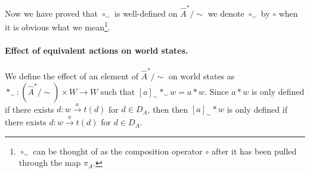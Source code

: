 Now we have proved that $\circ_{\sim}$ is well-defined on $\hat{A}^{\ast}/\sim$ we denote $\circ_{\sim}$ by $\circ$ when it is obvious what we mean\footnote{$\circ_{\sim}$ can be thought of as the composition operator $\circ$ after it has been pulled through the map $\pi_{A}$.}.

\paragraph{Effect of equivalent actions on world states.}
We define the effect of an element of  $\hat{A}^{\ast}/\sim$ on world states as $\ast_{\sim}: (\hat{A}^{\ast}/\sim) \times W \to W$ such that $[a]_{\sim} \ast_{\sim} w = a \ast w$.
Since $a \ast w$ is only defined if there exists $d: w \xrightarrow{a} t(d)$ for $d \in D_{A}$, then  then $[a]_{\sim} \ast w$ is only defined if there exists $d: w \xrightarrow{a} t(d)$ for $d \in D_{A}$.

